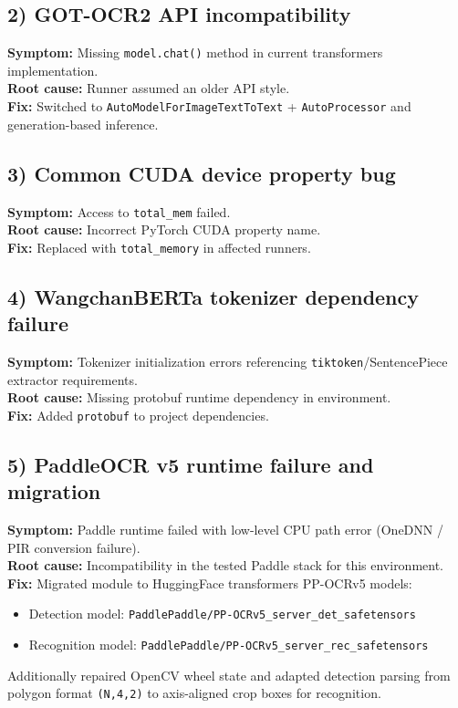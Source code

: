 \documentclass[11pt,a4paper]{article}
\begin{document}
\subsection*{2) GOT-OCR2 API incompatibility}
\textbf{Symptom:} Missing \texttt{model.chat()} method in current transformers implementation. \\
\textbf{Root cause:} Runner assumed an older API style. \\
\textbf{Fix:} Switched to \texttt{AutoModelForImageTextToText} + \texttt{AutoProcessor} and generation-based inference.

\subsection*{3) Common CUDA device property bug}
\textbf{Symptom:} Access to \texttt{total\_mem} failed. \\
\textbf{Root cause:} Incorrect PyTorch CUDA property name. \\
\textbf{Fix:} Replaced with \texttt{total\_memory} in affected runners.

\subsection*{4) WangchanBERTa tokenizer dependency failure}
\textbf{Symptom:} Tokenizer initialization errors referencing \texttt{tiktoken}/SentencePiece extractor requirements. \\
\textbf{Root cause:} Missing protobuf runtime dependency in environment. \\
\textbf{Fix:} Added \texttt{protobuf} to project dependencies.

\subsection*{5) PaddleOCR v5 runtime failure and migration}
\textbf{Symptom:} Paddle runtime failed with low-level CPU path error (OneDNN / PIR conversion failure). \\
\textbf{Root cause:} Incompatibility in the tested Paddle stack for this environment. \\
\textbf{Fix:} Migrated module to HuggingFace transformers PP-OCRv5 models:
\begin{itemize}
  \item Detection model: \texttt{PaddlePaddle/PP-OCRv5\_server\_det\_safetensors}
  \item Recognition model: \texttt{PaddlePaddle/PP-OCRv5\_server\_rec\_safetensors}
\end{itemize}
Additionally repaired OpenCV wheel state and adapted detection parsing from polygon format \texttt{(N,4,2)} to axis-aligned crop boxes for recognition.
\end{document}
